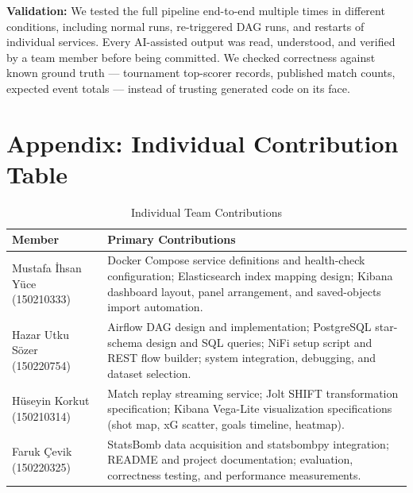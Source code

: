 \documentclass[conference]{IEEEtran}
\begin{document}
\textbf{Validation:} We tested the full pipeline end-to-end multiple times in
different conditions, including normal runs, re-triggered DAG runs, and
restarts of individual services. Every AI-assisted output was read,
understood, and verified by a team member before being committed. We checked
correctness against known ground truth — tournament top-scorer records,
published match counts, expected event totals — instead of trusting generated
code on its face.


\section*{Appendix: Individual Contribution Table}

\begin{table}[ht]
\caption{Individual Team Contributions}
\label{tab:contrib}
\renewcommand{\arraystretch}{1.15}
\begin{tabular}{@{}p{2.1cm}p{5.6cm}@{}}
\toprule
\textbf{Member} & \textbf{Primary Contributions} \\
\midrule
Mustafa \.{I}hsan Y\"{u}ce (150210333) &
  Docker Compose service definitions and health-check configuration;
  Elasticsearch index mapping design; Kibana dashboard layout,
  panel arrangement, and saved-objects import automation. \\[4pt]
Hazar Utku S\"{o}zer (150220754) &
  Airflow DAG design and implementation; PostgreSQL star-schema design
  and SQL queries; NiFi setup script and REST flow builder;
  system integration, debugging, and dataset selection. \\[4pt]
H\"{u}seyin Korkut (150210314) &
  Match replay streaming service; Jolt SHIFT transformation
  specification; Kibana Vega-Lite visualization specifications
  (shot map, xG scatter, goals timeline, heatmap). \\[4pt]
Faruk \c{C}evik (150220325) &
  StatsBomb data acquisition and statsbombpy integration;
  README and project documentation; evaluation, correctness
  testing, and performance measurements. \\
\bottomrule
\end{tabular}
\end{table}
\end{document}
